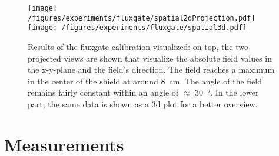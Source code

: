         \begin{figure}
            \label{fig:results:fluxgate:plotSpatial3d}
            \centering
            \texttt{[image: /figures/experiments/fluxgate/spatial2dProjection.pdf]}
            \texttt{[image: /figures/experiments/fluxgate/spatial3d.pdf]}
            \caption[Fluxgate calibration]{Results of the fluxgate calibration visualized: on top, the two projected views are shown that visualize the absolute field values in the x-y-plane and the field's direction. The field reaches a maximum in the center of the shield at around \SI{8}{\centi\meter}. The angle of the field remains fairly constant within an angle of $\approx$ \SI{30}{\degree}. In the lower part, the same data is shown as a 3d plot for a better overview.}
        \end{figure}
\section{Measurements}

